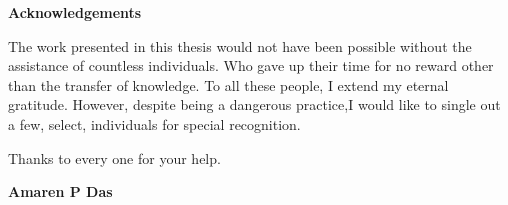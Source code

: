 \doublespacing
\newpage
\thispagestyle{empty}
\mbox{}

\newpage
\thispagestyle{empty}

\begin{center}
\textbf{\Large{Acknowledgements}}
\bigskip
\bigskip
\end{center}

The work presented in this thesis would not have been possible without the assistance
of countless individuals. Who gave up their time for no reward other than the transfer of knowledge. To all these people, I extend my eternal gratitude. However, despite being a dangerous practice,I would like to single out a few, select, individuals for special recognition.

Thanks to every one for your help.



\bigskip
\bigskip
\bigskip
\bigskip

\hfill \textbf{Amaren P Das}

\restoregeometry
